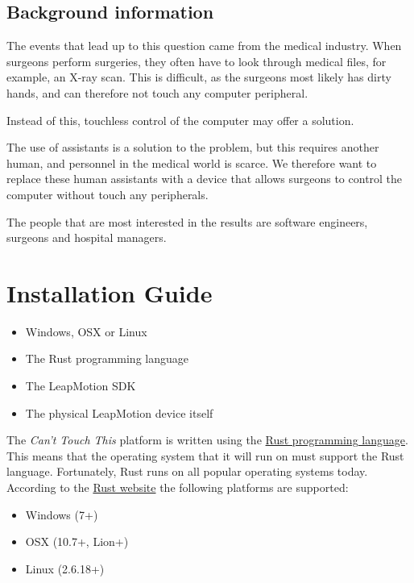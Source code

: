\documentclass[a4paper]{article}
\providecommand{\tightlist}{%
\setlength{\itemsep}{0pt}\setlength{\parskip}{0pt}}
\begin{document}
  \subsection{Background information}
  The events that lead up to this question came from the medical industry. When
  surgeons perform surgeries, they often have to look through medical files, for
  example, an X-ray scan. This is difficult, as the surgeons most likely has
  dirty hands, and can therefore not touch any computer peripheral.
  
  
  Instead of this, touchless control of the computer may offer a solution.

  The use of assistants is a solution to the problem, but this requires another
  human, and personnel in the medical world is scarce. We therefore want to
  replace these human assistants with a device that allows surgeons to control
  the computer without touch any peripherals.

  The people that are most interested in the results are software engineers,
  surgeons and hospital managers.
  \clearpage

  \section{Installation Guide}
  \begin{itemize}
    \tightlist
    \item Windows, OSX or Linux
    \item The Rust programming language
    \item The LeapMotion SDK
    \item The physical LeapMotion device itself
  \end{itemize}

  The \textit{Can't Touch This} platform is written using the
  \href{https://www.rust-lang.org/en-US/}{Rust programming language}.
  This means that the operating system that it will run on must
  support the Rust language. Fortunately, Rust runs on all popular operating
  systems today. According to the
  \href{https://forge.rust-lang.org/platform-support.html}{Rust website} the
  following platforms are supported:

  \begin{itemize}
    \tightlist
    \item Windows (7+)
    \item OSX (10.7+, Lion+)
    \item Linux (2.6.18+)
  \end{itemize}
\end{document}

